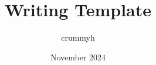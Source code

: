 \documentclass{classworktemplate}
\title{Writing Template}
\author{crummyh}
\date{November 2024}
\begin{document}
\maketitle

\blindtext
\end{document}
